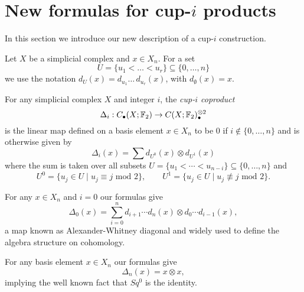
\section{New formulas for cup-\texorpdfstring{$i$}{i} products} \label{s:formulas}

In this section we introduce our new description of a cup-$i$ construction.

Let $X$ be a simplicial complex and $x \in X_n$.
For a set
\begin{equation*}
U = \{u_1 < \dots < u_r\} \subseteq \{0, \dots, n\}
\end{equation*}
we use the notation $d_U(x) = d_{u_1} \ldots\, d_{u_r}(x)$, with $d_{\emptyset}(x) = x$.

\begin{definition} \label{d:cup-i coproducts}
	For any simplicial complex $X$ and integer $i$, the \textit{cup-$i$ coproduct}
	\begin{equation*}
	\Delta_i : C_\bullet(X; {\mathbb{F}_2}) \to C(X; {\mathbb{F}_2})^{\otimes 2}_\bullet
	\end{equation*}
	is the linear map defined on a basis element $x \in X_n$ to be $0$ if $i \not\in \{0, \dots, n\}$ and is otherwise given by
	\begin{equation} \label{equation: simplicial cup-i coproducts}
	\Delta_i(x) = \sum d_{U^0}(x) \otimes d_{U^1}(x)
	\end{equation}
	where the sum is taken over all subsets $U = \{u_1 < \cdots < u_{n-i}\} \subseteq \{0, \dots, n\}$ and
	\begin{equation*}
	U^0 = \{u_j \in U\mid u_j \equiv j \text{ mod } 2\}, \qquad
	U^1 = \{u_j \in U\mid u_j \not\equiv j \text{ mod } 2\}.
	\end{equation*}
\end{definition}

\begin{example} \label{ex:alexander-whitney diagonal}
	For any $x \in X_n$ and $i = 0$ our formulas give
	\begin{equation*}
	\Delta_0(x) = \sum_{i=0}^n d_{i+1} \cdots d_{n}(x) \otimes d_{0} \cdots d_{i-1}(x),
	\end{equation*}
	a map known as Alexander-Whitney diagonal and widely used to define the algebra structure on cohomology.
\end{example}

\begin{example} \label{ex:Sq0 is the identity}
	For any basis element $x \in X_n$ our formulas give
	\begin{equation*}
	\Delta_n(x) = x \otimes x,
	\end{equation*}
	implying the well known fact that $Sq^0$ is the identity.
\end{example}

